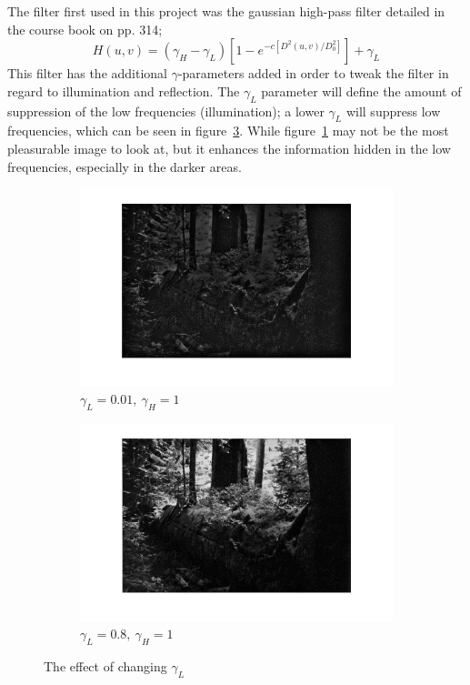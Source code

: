 		The filter first used in this project was
		the gaussian high-pass filter detailed in the course book on pp. 314; 
		\begin{equation}
		\label{eqn:gaussian_filter}
			H(u,v) = \left( \gamma_H - \gamma_L \right) \left[ 1 - e^{-c \left[D^2(u,v)/D_0^2\right]}\right] + \gamma_L 
		\end{equation}
		This filter has the additional $\gamma$-parameters added in order to tweak
		the filter in regard to illumination and reflection. The $\gamma_L$ parameter
		will define the amount of suppression of the low frequencies (illumination); a lower $\gamma_L$
		will suppress low frequencies, which can be seen in figure~\ref{fig:various_low_gamma}. While
		figure~\ref{fig:low_freq_supp} may not be the most pleasurable image to look at, but it 
		enhances the information hidden in the low frequencies, especially in the darker areas.
		\begin{figure}[h!]
		\centering
		\begin{subfigure}[b]{0.6\textwidth}
			\includegraphics[width=\textwidth]{pics/suppressed_low_frequences.png}
			\caption{$\gamma_L = 0.01,~\gamma_H = 1$}
			\label{fig:low_freq_supp}
			\end{subfigure}%
			\begin{subfigure}[b]{0.6\textwidth}
			\includegraphics[width=\textwidth]{pics/non_suppressed_low_frequences.png}
			\caption{$\gamma_L = 0.8,~\gamma_H = 1$}
			\label{fig:low_freq_non_supp}
			\end{subfigure}
			\label{fig:various_low_gamma}
			\caption{The effect of changing $\gamma_L$}				
		\end{figure}		
